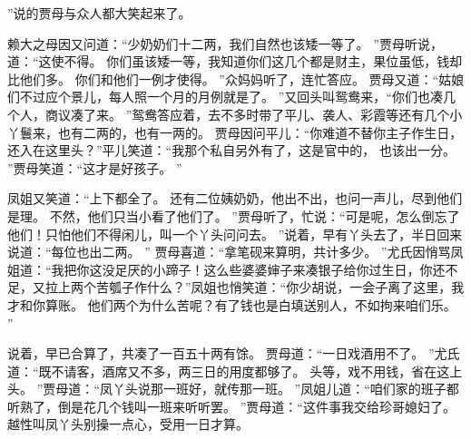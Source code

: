 ”说的贾母与众人都大笑起来了。
\par
赖大之母因又问道：“少奶奶们十二两，我们自然也该矮一等了。
”贾母听说，道：“这使不得。
你们虽该矮一等，我知道你们这几个都是财主，果位虽低，钱却比他们多。
你们和他们一例才使得。
”众妈妈听了，连忙答应。
贾母又道：“姑娘们不过应个景儿，每人照一个月的月例就是了。
”又回头叫鸳鸯来，“你们也凑几个人，商议凑了来。
”鸳鸯答应着，去不多时带了平儿、袭人、彩霞等还有几个小丫鬟来，也有二两的，也有一两的。
贾母因问平儿：“你难道不替你主子作生日，还入在这里头？”平儿笑道：“我那个私自另外有了，这是官中的，
也该出一分。
”贾母笑道：“这才是好孩子。
”\par
凤姐又笑道：“上下都全了。
还有二位姨奶奶，他出不出，也问一声儿，尽到他们是理。
不然，他们只当小看了他们了。
”贾母听了，忙说：“可是呢，怎么倒忘了他们！只怕他们不得闲儿，叫一个丫头问问去。
”说着，早有丫头去了，半日回来说道：“每位也出二两。
”
贾母喜道：“拿笔砚来算明，共计多少。
”尤氏因悄骂凤姐道：“我把你这没足厌的小蹄子！这么些婆婆婶子来凑银子给你过生日，你还不足，又拉上两个苦瓠子作什么？”凤姐也悄笑道：“你少胡说，一会子离了这里，我才和你算账。
他们两个为什么苦呢？有了钱也是白填送别人，不如拘来咱们乐。
”\par
说着，早已合算了，共凑了一百五十两有馀。
贾母道：“一日戏酒用不了。
”尤氏道：“既不请客，酒席又不多，两三日的用度都够了。
头等，戏不用钱，省在这上头。
”贾母道：“凤丫头说那一班好，就传那一班。
”凤姐儿道：“咱们家的班子都听熟了，倒是花几个钱叫一班来听听罢。
”贾母道：“这件事我交给珍哥媳妇了。
越性叫凤丫头别操一点心，受用一日才算。
